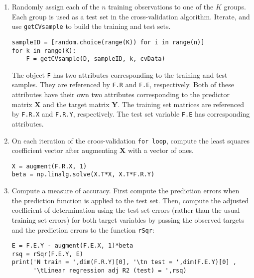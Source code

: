 \documentclass[graybox,envcountchap]{svmono}
\newcommand{\Yf}{\mathbf{Y}}
\newcommand{\Xf}{\mathbf{X}}
\newcommand{\tx}{\texttt}
\begin{document}
\begin{enumerate}
\item Randomly assign each of the $n$ training observations to one of the $K$ groups. Each group is used as a test set in the cross-validation algorithm. Iterate, and use \tx{getCVsample} to build the training and test sets.

\small 
\begin{svgraybox}
\begin{verbatim}
sampleID = [random.choice(range(K)) for i in range(n)]
for k in range(K):
    F = getCVsample(D, sampleID, k, cvData)    
\end{verbatim}
\end{svgraybox}
\normalsize

The object \tx{F} has two attributes corresponding to the training and test samples. They are referenced by \tx{F.R} and \tx{F.E}, respectively. Both of these attributes have their own two attributes corresponding to the predictor matrix $\Xf$ and the target matrix $\Yf$. The training set matrices are referenced by \tx{F.R.X} and \tx{F.R.Y}, respectively. The test set variable \tx{F.E} has corresponding attributes. 

\item On each iteration of the croos-validation \tx{for loop}, compute the least squares coefficient vector after augmenting $\Xf$ with a vector of ones.

\small 
\begin{svgraybox}
\begin{verbatim}
X = augment(F.R.X, 1)
beta = np.linalg.solve(X.T*X, X.T*F.R.Y)   
\end{verbatim}
\end{svgraybox}
\normalsize

\item Compute a measure of accuracy.  First compute the prediction errors when the prediction function is applied to the test set. Then, compute the adjusted coefficient of determination using the test set errors (rather than the usual training set errors) for both target variables by passing the observed targets and the prediction errors to the function \tx{rSqr}: 

\small 
\begin{svgraybox}
\begin{verbatim}
E = F.E.Y - augment(F.E.X, 1)*beta
rsq = rSqr(F.E.Y, E) 
print('N train = ',dim(F.R.Y)[0], '\tn test = ',dim(F.E.Y)[0] ,
      '\tLinear regression adj R2 (test) = ',rsq)
\end{verbatim}
\end{svgraybox}
\normalsize

\end{enumerate}
\end{document}
